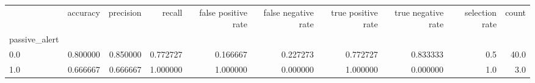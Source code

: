 \begin{tabular}{lrrrrrrrrr}
\toprule
{} &  accuracy &  precision &    recall &  false positive rate &  false negative rate &  true positive rate &  true negative rate &  selection rate &  count \\
passive\_alert &           &            &           &                      &                      &                     &                     &                 &        \\
\midrule
0.0           &  0.800000 &   0.850000 &  0.772727 &             0.166667 &             0.227273 &            0.772727 &            0.833333 &             0.5 &   40.0 \\
1.0           &  0.666667 &   0.666667 &  1.000000 &             1.000000 &             0.000000 &            1.000000 &            0.000000 &             1.0 &    3.0 \\
\bottomrule
\end{tabular}
